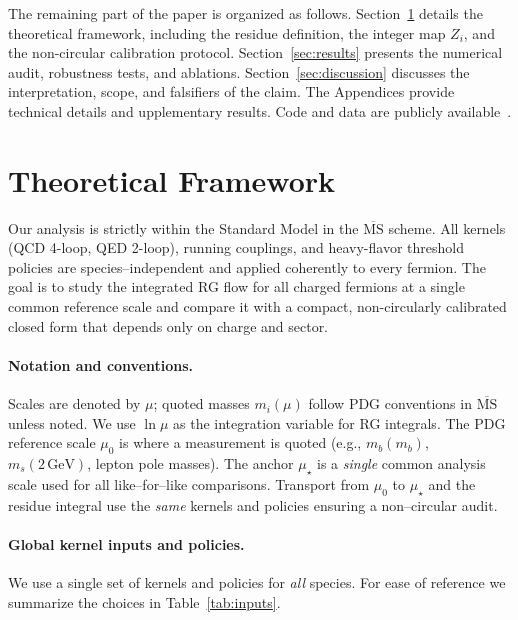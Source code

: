 \documentclass[aps,prd,onecolumn,amsmath,amssymb,superscriptaddress,nofootinbib,showpacs,showkeys]{revtex4-2}
\begin{document}
The remaining part of the paper is organized as follows.
Section~\ref{sec:framework} details the theoretical framework, including the residue definition,
the integer map $Z_i$, and the non-circular calibration protocol.
Section~\ref{sec:results} presents the numerical audit, robustness tests, and ablations.
Section~\ref{sec:discussion} discusses the interpretation, scope, and falsifiers of the claim.
The Appendices provide technical details and upplementary results.
Code and data are publicly available~\cite{fundamental-masses-repo}.




\section{Theoretical Framework}
\label{sec:framework}

Our analysis is strictly within the Standard Model in the $\overline{\mathrm{MS}}$ scheme. All kernels (QCD 4-loop, QED 2-loop), running couplings, and heavy-flavor threshold policies are species–independent and applied coherently to every fermion. The goal is to study the integrated RG flow for all charged fermions at a single common reference scale and compare it with a compact, non-circularly calibrated closed form that depends only on charge and sector.

\paragraph{Notation and conventions.}
Scales are denoted by $\mu$; quoted masses $m_i(\mu)$ follow PDG conventions in $\overline{\mathrm{MS}}$ unless noted. We use $\ln\mu$ as the integration variable for RG integrals. The PDG reference scale $\mu_0$ is where a measurement is quoted (e.g., $m_b(m_b)$, $m_s(2\,\mathrm{GeV})$, lepton pole masses). The anchor $\mu_\star$ is a \emph{single} common analysis scale used for all like–for–like comparisons. Transport from $\mu_0$ to $\mu_\star$ and the residue integral use the \emph{same} kernels and policies %
ensuring a non–circular audit.

\paragraph{Global kernel inputs and policies.}
We use a single set of kernels and policies for \emph{all} species. %
For ease of reference we summarize the choices in Table~\ref{tab:inputs}.
\end{document}
